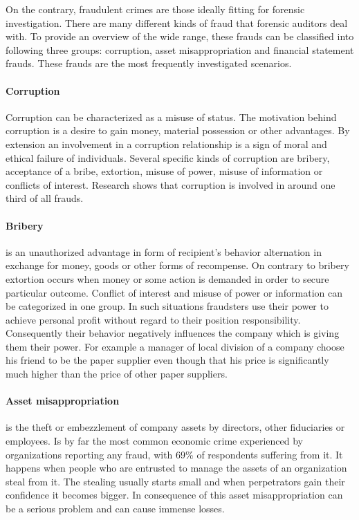 On the contrary, fraudulent crimes are those ideally fitting for forensic investigation. There are many different kinds of fraud that forensic auditors deal with. To provide an overview of the wide range, these frauds can be classified into following three groups: corruption, asset misappropriation and financial statement frauds. These frauds are the most frequently investigated scenarios.

\paragraph {Corruption}
Corruption can be characterized as a misuse of status. The motivation behind corruption is a desire to gain money, material possession or other advantages. By extension an involvement in a corruption relationship is a sign of moral and ethical failure of individuals. Several specific kinds of corruption are bribery, acceptance of a bribe, extortion, misuse of power, misuse of information or conflicts of interest. Research shows that corruption is involved in around one third of all frauds. \cite{weaver}

\paragraph{Bribery} is an unauthorized advantage in form of recipient's behavior alternation in exchange for money, goods or other forms of recompense. On contrary to bribery extortion occurs when money or some action is demanded in order to secure particular outcome. Conflict of interest and misuse of power or information can be categorized in one group. In such situations fraudsters use their power to achieve personal profit without regard to their position responsibility. Consequently their behavior negatively influences the company which is giving them their power. For example a manager of local division of a company choose his friend to be the paper supplier even though that his price is significantly much higher than the price of other paper suppliers.


\paragraph {Asset misappropriation}
is the theft or embezzlement of company assets by directors, other fiduciaries or employees. Is by far the most common economic crime experienced by organizations reporting any fraud, with 69\% of respondents suffering from it. \cite{pwc-asset} It happens when people who are entrusted to manage the assets of an organization steal from it. The stealing usually starts small and when perpetrators gain their confidence it becomes bigger. In consequence of this asset misappropriation can be a serious problem and can cause immense losses. 

